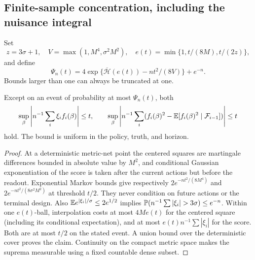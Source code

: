 \subsection{Finite-sample concentration, including the nuisance integral}
Set
\[
 z=3\sigma+1,\quad V=\max(1,M^4,\sigma^2M^2),\quad
 e(t)=\min\{1,t/(8M),t/(2z)\},
\]
and define
\begin{equation}
 \Psi_n(t)=4\exp\{\overline{\mathcal H}(e(t))-nt^2/(8V)\}+e^{-n}.
 \label{eq:field-tail}
\end{equation}
Bounds larger than one can always be truncated at one.

\begin{proposition}
\label{prop:concentration}
Except on an event of probability at most $\Psi_n(t)$, both
\[
 \sup_\beta\left|n^{-1}\sum_i\xi_i f_i(\beta)\right|\le t,
 \qquad
 \sup_\beta\left|n^{-1}\sum_i
 (f_i(\beta)^2-\mathbb E[f_i(\beta)^2\mid\mathcal F_{i-1}])\right|\le t
\]
hold. The bound is uniform in the policy, truth, and horizon.
\end{proposition}
\begin{proof}
At a deterministic metric-net point the centered squares are martingale
differences bounded in absolute value by $M^2$, and conditional Gaussian
exponentiation of the score is taken after the current actions but before the
readout. Exponential Markov bounds give respectively
$2e^{-nt^2/(8M^4)}$ and $2e^{-nt^2/(8\sigma^2M^2)}$ at threshold $t/2$.
They never condition on future actions or the terminal design. Also
$\mathbb E e^{|\xi_i|/\sigma}\le2e^{1/2}$ implies
$\Pp(n^{-1}\sum|\xi_i|>3\sigma)\le e^{-n}$.
Within one $e(t)$-ball, interpolation costs at most $4Me(t)$ for the centered
square (including its conditional expectation), and at most
$e(t)n^{-1}\sum|\xi_i|$ for the score. Both are at most $t/2$ on the stated
event. A union bound over the deterministic cover proves the claim. Continuity
on the compact metric space makes the suprema measurable using a fixed
countable dense subset.
\end{proof}

